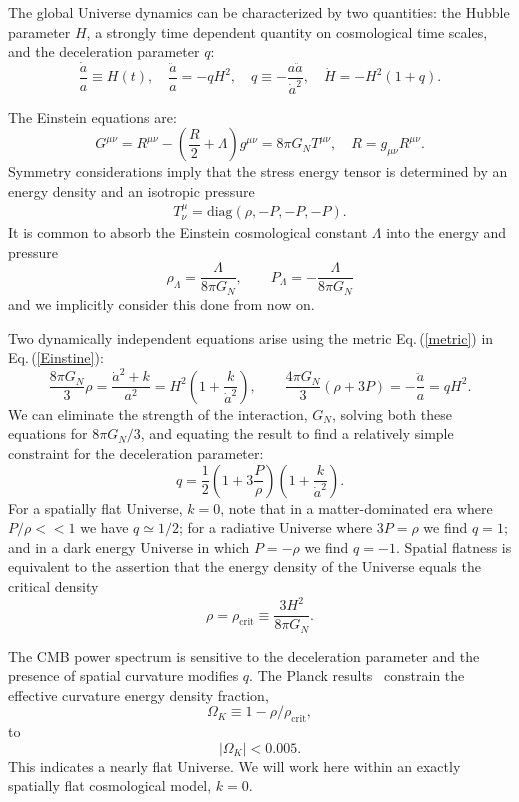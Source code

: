 \documentclass[Universe,article,submit,moreauthors,pdftex]{Definitions/mdpi}
\newcommand{\beqn}{\begin{equation}}
\newcommand{\eeqn}{\end{equation}}
\newcommand{\req}[1]{Eq.\,(\ref{#1})}
\begin{document}
The global Universe dynamics can be characterized by two  quantities: the Hubble parameter  $H$, a strongly time dependent quantity on cosmological time scales,  and the deceleration parameter $q$:
\beqn\label{dynamic}
\frac{\dot a }{a}\equiv H(t) ,\quad \frac{\ddot a}{a}=-qH^2,\quad 
q\equiv -\frac{a\ddot a}{\dot a^2},\quad \dot H=-H^2(1+q). 
\eeqn

The Einstein equations are:
\beqn\label{Einstine}
G^{\mu\nu}=R^{\mu\nu}-\left(\frac R 2 +\Lambda\right) g^{\mu\nu}=8\pi G_N T^{\mu\nu},  
\quad R= g_{\mu\nu}R^{\mu\nu}.
\eeqn
Symmetry considerations imply that the stress energy tensor is determined by an energy density and an isotropic pressure
\begin{align}
 T^\mu_\nu =\mathrm{diag}(\rho, -P, -P, -P).
\end{align}
It is common to absorb the Einstein cosmological constant $\Lambda$ into the energy and pressure
\beqn\label{EpsLam}
\rho_\Lambda=\frac{\Lambda}{8\pi G_N}, \qquad P_\Lambda=-\frac{\Lambda}{8\pi G_N}
\eeqn
and we implicitly consider this done from now on.

Two dynamically independent equations arise using the metric \req{metric} in \req{Einstine}:
\beqn\label{hubble}
\frac{8\pi G_N}{3} \rho =  \frac{\dot a^2+k}{a^2}
=H^2\left( 1+\frac { k }{\dot a^2}\right),
\qquad
\frac{4\pi G_N}{3} (\rho+3P)  =-\frac{\ddot a}{a}=qH^2.
\eeqn
We can eliminate the strength of the interaction, $G_N$,  solving both these equations for ${8\pi G_N}/{3}$, and equating the result to find a relatively simple constraint for the deceleration parameter:
\beqn\label{qparam}
q=\frac 1 2 \left(1+3\frac{P}{\rho}\right)\left(1+\frac{k}{\dot a^2}\right).
\eeqn
For a spatially flat Universe, $k=0$, note that in a  matter-dominated era where $P/\rho<<1$ we have $q\simeq 1/2$; for a radiative Universe where $3P=\rho$ we find $q= 1 $; and  in a dark energy Universe in which $P=-\rho$  we find $q=-1$.  Spatial flatness is equivalent to the assertion that the energy density of the Universe equals the critical density
\begin{equation}\label{crit_density}
\rho=\rho_{\text{crit}}\equiv \frac{3H^2}{8\pi G_N}.
\end{equation}

 The CMB power spectrum is sensitive to the  deceleration parameter  and the presence of spatial curvature modifies $q$. The Planck results~\cite{Planck} constrain  the effective curvature energy density fraction,
\begin{equation}
\Omega_K\equiv1-\rho/\rho_{\text{crit}},
\end{equation}
to
\begin{equation}
|\Omega_K|<0.005.
\end{equation}
This indicates a nearly flat Universe. We will work here within an exactly spatially flat cosmological model, $k=0$.  
\end{document}
